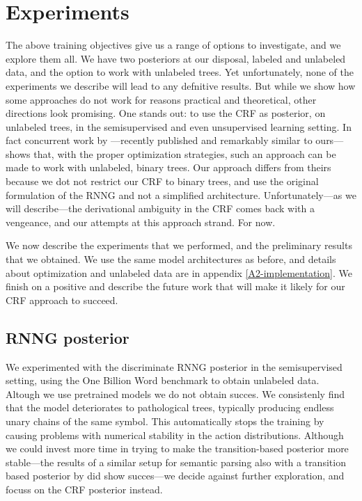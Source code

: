 \section{Experiments}
  The above training objectives give us a range of options to investigate, and we explore them all. We have two posteriors at our disposal, labeled and unlabeled data, and the option to work with unlabeled trees. Yet unfortunately, none of the experiments we describe will lead to any defnitive results. But while we show how some approaches do not work for reasons practical and theoretical, other directions look promising. One stands out: to use the CRF as posterior, on unlabeled trees, in the semisupervised and even unsupervised learning setting. In fact concurrent work by \citet{kim2019unsupervised}---recently published and remarkably similar to ours---shows that, with the proper optimization strategies, such an approach can be made to work with unlabeled, binary trees. Our approach differs from theirs because we dot not restrict our CRF to binary trees, and use the original formulation of the RNNG and not a simplified architecture. Unfortunately---as we will describe---the derivational ambiguity in the CRF comes back with a vengeance, and our attempts at this approach strand. For now.

  We now describe the experiments that we performed, and the preliminary results that we obtained. We use the same model architectures as before, and details about optimization and unlabeled data are in appendix \ref{A2-implementation}. We finish on a positive and describe the future work that will make it likely for our CRF approach to succeed.

  \subsection{RNNG posterior}
    We experimented with the discriminate RNNG posterior in the semisupervised setting, using the One Billion Word benchmark to obtain unlabeled data. Altough we use pretrained models we do not obtain succes. We consistenly find that the model deteriorates to pathological trees, typically producing endless unary chains of the same symbol. This automatically stops the training by causing problems with numerical stability in the action distributions. Although we could invest more time in trying to make the transition-based posterior more stable---the results of a similar setup for semantic parsing also with a transition based posterior by \citet{yin2018structvae} did show succes---we decide against further exploration, and focuss on the CRF posterior instead.

